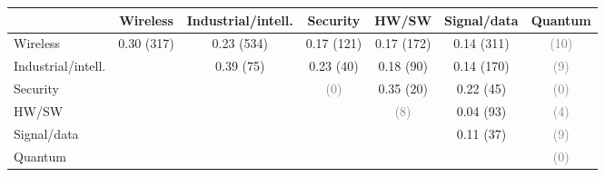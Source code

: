 \begin{tabular}{lcccccc}
\toprule
 & Wireless & Industrial/intell. & Security & HW/SW & Signal/data & Quantum\\
\midrule
Wireless & 0.30 (317) & 0.23 (534) & 0.17 (121) & 0.17 (172) & 0.14 (311) & \textcolor{gray}{(10)}\\
Industrial/intell. &  & 0.39 (75) & 0.23 (40) & 0.18 (90) & 0.14 (170) & \textcolor{gray}{(9)}\\
Security &  &  & \textcolor{gray}{(0)} & 0.35 (20) & 0.22 (45) & \textcolor{gray}{(0)}\\
HW/SW &  &  &  & \textcolor{gray}{(8)} & 0.04 (93) & \textcolor{gray}{(4)}\\
Signal/data &  &  &  &  & 0.11 (37) & \textcolor{gray}{(9)}\\
Quantum &  &  &  &  &  & \textcolor{gray}{(0)}\\
\bottomrule
\end{tabular}